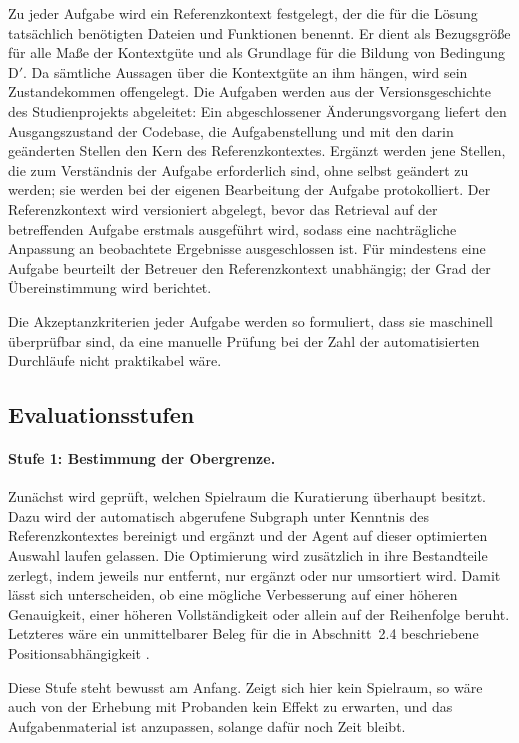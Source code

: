 Zu jeder Aufgabe wird ein Referenzkontext festgelegt, der die für die Lösung tatsächlich benötigten Dateien und Funktionen benennt. Er dient als Bezugsgröße für alle Maße der Kontextgüte und als Grundlage für die Bildung von Bedingung D$'$. Da sämtliche Aussagen über die Kontextgüte an ihm hängen, wird sein Zustandekommen offengelegt. Die Aufgaben werden aus der Versionsgeschichte des Studienprojekts abgeleitet: Ein abgeschlossener Änderungsvorgang liefert den Ausgangszustand der Codebase, die Aufgabenstellung und mit den darin geänderten Stellen den Kern des Referenzkontextes. Ergänzt werden jene Stellen, die zum Verständnis der Aufgabe erforderlich sind, ohne selbst geändert zu werden; sie werden bei der eigenen Bearbeitung der Aufgabe protokolliert. Der Referenzkontext wird versioniert abgelegt, bevor das Retrieval auf der betreffenden Aufgabe erstmals ausgeführt wird, sodass eine nachträgliche Anpassung an beobachtete Ergebnisse ausgeschlossen ist. Für mindestens eine Aufgabe beurteilt der Betreuer den Referenzkontext unabhängig; der Grad der Übereinstimmung wird berichtet.

Die Akzeptanzkriterien jeder Aufgabe werden so formuliert, dass sie maschinell überprüfbar sind, da eine manuelle Prüfung bei der Zahl der automatisierten Durchläufe nicht praktikabel wäre.

\subsection{Evaluationsstufen}

\paragraph{Stufe 1: Bestimmung der Obergrenze.} Zunächst wird geprüft, welchen Spielraum die Kuratierung überhaupt besitzt. Dazu wird der automatisch abgerufene Subgraph unter Kenntnis des Referenzkontextes bereinigt und ergänzt und der Agent auf dieser optimierten Auswahl laufen gelassen. Die Optimierung wird zusätzlich in ihre Bestandteile zerlegt, indem jeweils nur entfernt, nur ergänzt oder nur umsortiert wird. Damit lässt sich unterscheiden, ob eine mögliche Verbesserung auf einer höheren Genauigkeit, einer höheren Vollständigkeit oder allein auf der Reihenfolge beruht. Letzteres wäre ein unmittelbarer Beleg für die in Abschnitt~2.4 beschriebene Positionsabhängigkeit \parencite{liu2023lostmiddle,wu2025positionbias}.

Diese Stufe steht bewusst am Anfang. Zeigt sich hier kein Spielraum, so wäre auch von der Erhebung mit Probanden kein Effekt zu erwarten, und das Aufgabenmaterial ist anzupassen, solange dafür noch Zeit bleibt.

